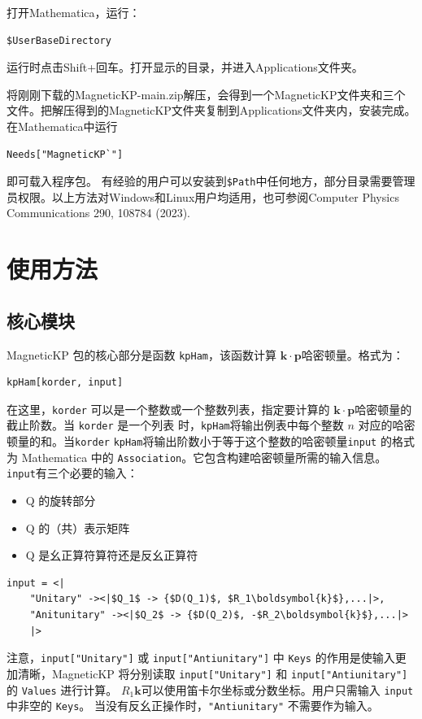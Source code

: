 \documentclass[titlepage,a4paper,12pt,AutoFakeBold]{article}
\begin{document}
打开Mathematica，运行：
\begin{lstlisting}[numbers=none]
$UserBaseDirectory
\end{lstlisting}
运行时点击Shift+回车。打开显示的目录，并进入Applications文件夹。

将刚刚下载的MagneticKP-main.zip解压，会得到一个MagneticKP文件夹和三个文件。把解压得到的MagneticKP文件夹复制到Applications文件夹内，安装完成。在Mathematica中运行
\begin{lstlisting}[numbers=none]
Needs["MagneticKP`"]
\end{lstlisting}	
即可载入程序包。
有经验的用户可以安装到\lstinline|$Path|中任何地方，部分目录需要管理员权限。以上方法对Windows和Linux用户均适用，也可参阅Computer Physics Communications 290, 108784 (2023).


\section{使用方法}
\subsection{核心模块}

\textsf{MagneticKP} 包的核心部分是函数 \lstinline!kpHam!，该函数计算 $\boldsymbol{k}\cdot\boldsymbol{p}$哈密顿量。格式为：
\begin{lstlisting}[backgroundcolor={\color{yellow!5!white}},mathescape=true]
	kpHam[korder, input]
\end{lstlisting}
在这里，\lstinline!korder! 可以是一个整数或一个整数列表，指定要计算的 
$\boldsymbol{k}\cdot\boldsymbol{p}$哈密顿量的截止阶数。当 \lstinline!korder! 是一个列表 
时，\lstinline!kpHam!将输出例表中每个整数 $n$ 对应的哈密顿量的和。当\lstinline!korder! \lstinline!kpHam!将输出阶数小于等于这个整数的哈密顿量\lstinline!input! 的格式为 Mathematica 中的 \lstinline!Association!。它包含构建哈密顿量所需的输入信息。
\lstinline!input!有三个必要的输入：
\begin{itemize}
	\item Q 的旋转部分
	\item Q 的（共）表示矩阵
	\item Q 是幺正算符算符还是反幺正算符
\end{itemize}
\begin{lstlisting}[backgroundcolor={\color{yellow!5!white}},mathescape=true]
	input = <|
	"Unitary" -><|$Q_1$ -> {$D(Q_1)$, $R_1\boldsymbol{k}$},...|>,
	"Anitunitary" -><|$Q_2$ -> {$D(Q_2)$, -$R_2\boldsymbol{k}$},...|>
	|>
\end{lstlisting}
注意，\lstinline|input["Unitary"]| 或 \lstinline|input["Antiunitary"]| 中 \lstinline|Keys| 的作用是使输入更加清晰，\textsf{MagneticKP} 将分别读取 \lstinline|input["Unitary"]| 和 \lstinline|input["Antiunitary"]| 的 \lstinline|Values| 进行计算。
$R_1\boldsymbol{k}$可以使用笛卡尔坐标或分数坐标。用户只需输入 \lstinline|input| 中非空的 \lstinline|Keys|。
当没有反幺正操作时，\lstinline!"Antiunitary"! 不需要作为输入。
\end{document}
